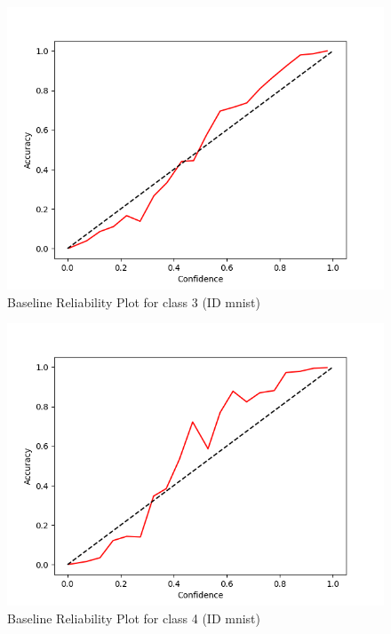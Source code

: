 \documentclass[11pt]{article}
\begin{document}
\begin{figure}[htbp]
\centering
\includegraphics[width=.9\linewidth]{./base_mnist_rel_3.png}
\caption{\label{fig:orgeebf6df}
Baseline Reliability Plot for class 3 (ID mnist)}
\end{figure}

\begin{figure}[htbp]
\centering
\includegraphics[width=.9\linewidth]{./base_mnist_rel_4.png}
\caption{\label{fig:org7816d2a}
Baseline Reliability Plot for class 4 (ID mnist)}
\end{figure}
\end{document}
